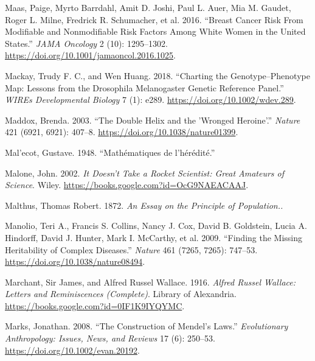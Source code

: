 \documentclass[
]{book}
\newlength{\cslhangindent}
\newlength{\cslentryspacingunit} %
\newenvironment{CSLReferences}[2] %
 {%
  \setlength{\parindent}{0pt}
  \ifodd #1
  \let\oldpar\par
  \def\par{\hangindent=\cslhangindent\oldpar}
  \fi
  \setlength{\parskip}{#2\cslentryspacingunit}
 }%
 {}
\begin{document}
\begin{CSLReferences}{1}{0}
\leavevmode{}%
Maas, Paige, Myrto Barrdahl, Amit D. Joshi, Paul L. Auer, Mia M. Gaudet, Roger L. Milne, Fredrick R. Schumacher, et al. 2016. {``Breast {Cancer Risk From Modifiable} and {Nonmodifiable Risk Factors Among White Women} in the {United States}.''} \emph{JAMA Oncology} 2 (10): 1295--1302. \url{https://doi.org/10.1001/jamaoncol.2016.1025}.

\leavevmode{}%
Mackay, Trudy F. C., and Wen Huang. 2018. {``Charting the Genotype--Phenotype Map: Lessons from the {Drosophila} Melanogaster {Genetic Reference Panel}.''} \emph{WIREs Developmental Biology} 7 (1): e289. \url{https://doi.org/10.1002/wdev.289}.

\leavevmode{}%
Maddox, Brenda. 2003. {``The Double Helix and the 'Wronged Heroine'.''} \emph{Nature} 421 (6921, 6921): 407--8. \url{https://doi.org/10.1038/nature01399}.

\leavevmode{}%
Mal'ecot, Gustave. 1948. {``Mathématiques de l'hérédité.''}

\leavevmode{}%
Malone, John. 2002. \emph{It {Doesn}'t {Take} a {Rocket Scientist}: {Great Amateurs} of {Science}}. {Wiley}. \url{https://books.google.com?id=OcG9NAEACAAJ}.

\leavevmode{}%
Malthus, Thomas Robert. 1872. \emph{An {Essay} on the {Principle} of {Population}..}

\leavevmode{}%
Manolio, Teri A., Francis S. Collins, Nancy J. Cox, David B. Goldstein, Lucia A. Hindorff, David J. Hunter, Mark I. McCarthy, et al. 2009. {``Finding the Missing Heritability of Complex Diseases.''} \emph{Nature} 461 (7265, 7265): 747--53. \url{https://doi.org/10.1038/nature08494}.

\leavevmode{}%
Marchant, Sir James, and Alfred Russel Wallace. 1916. \emph{Alfred {Russel Wallace}: {Letters} and {Reminiscences} ({Complete})}. {Library of Alexandria}. \url{https://books.google.com?id=0IF1K9IYQYMC}.

\leavevmode{}%
Marks, Jonathan. 2008. {``The Construction of {Mendel}'s Laws.''} \emph{Evolutionary Anthropology: Issues, News, and Reviews} 17 (6): 250--53. \url{https://doi.org/10.1002/evan.20192}.


\end{CSLReferences}
\end{document}
